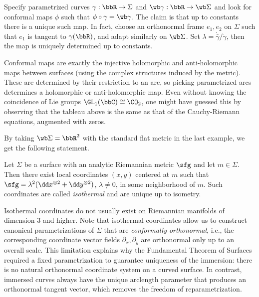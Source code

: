 \begin{example}
    Specify parametrized curves $\gamma:\bbR\to \Sigma$ and $\wb\gamma:\bbR\to \wb\Sigma$ and look for conformal maps $\phi$ such that $\phi\circ \gamma=\wb\gamma$. The claim is that up to constants there is a unique such map. In fact, choose an orthonormal frame $e_1,e_2$ on $\Sigma$ such that $e_1$ is tangent to $\gamma(\bbR)$, and adapt similarly on $\wb\Sigma$. Set $\lambda=\dot{\bar\gamma}/\dot\gamma$, then the map is uniquely determined up to constants.

    Conformal maps are exactly the injective holomorphic and anti-holomorphic maps between surfaces (using the complex structures induced by the metric). These are determined by their restriction to an arc, so picking parametrized arcs determines a holomorphic or anti-holomorphic map. Even without knowing the coincidence of Lie groups $\GL_1(\bbC)\cong\CO_2$, one might have guessed this by observing that the tableau above is the same as that of the Cauchy-Riemann equations, augmented with zeros.
\end{example}

By taking $\wb\Sigma=\bbR^2$ with the standard flat metric in the last example, we get the following statement.

\begin{cor}\label{cor isothermal coords}
    Let $\Sigma$ be a surface with an analytic Riemannian metric $\sfg$ and let $m\in\Sigma$. Then there exist local coordinates $(x,y)$ centered at $m$ such that $\sfg=\lambda^2(\dd x^{\otimes 2}+\dd y^{\otimes 2})$, $\lambda\neq 0$, in some neighborhood of $m$. Such coordinates are called \emph{isothermal} and are unique up to isometry. 
\end{cor}

Isothermal coordinates do not usually exist on Riemannian manifolds of dimension $3$ and higher.
Note that isothermal coordinates allow us to construct canonical parametrizations of $\Sigma$ that are \emph{conformally orthonormal}, i.e., the corresponding coordinate vector fields $\partial_x,\partial_y$ are orthonormal only up to an overall scale. This limitation explains why the Fundamental Theorem of Surfaces required a fixed parametrization to guarantee uniqueness of the immersion: there is no natural orthonormal coordinate system on a curved surface. In contrast, immersed curves always have the unique arclength parameter that produces an orthonormal tangent vector, which removes the freedom of reparametrization.


